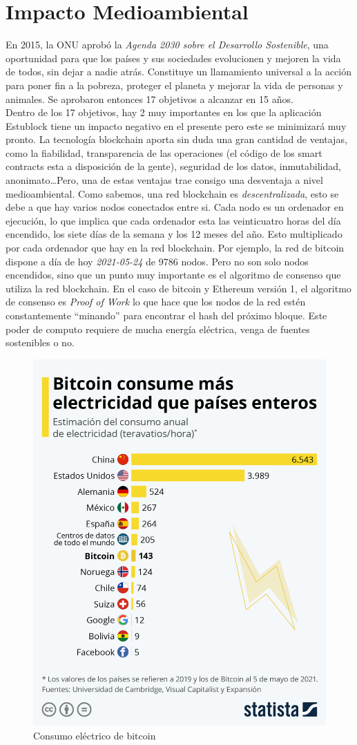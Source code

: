 \chapter{Impacto Medioambiental}
\label{cap:ImpactoMedioAmbiente}

En 2015, la ONU aprobó la \emph{Agenda 2030 sobre el Desarrollo Sostenible}\cite{agenda2030}, una oportunidad para que los países y sus sociedades evolucionen y mejoren la vida de todos, sin dejar a nadie atrás. Constituye un llamamiento universal a la acción para poner fin a la pobreza, proteger el planeta y mejorar la vida de personas y animales. Se aprobaron entonces 17 objetivos\cite{17objetivos} a alcanzar en 15 años. \\

Dentro de los 17 objetivos, hay 2 muy importantes en los que la aplicación Estublock tiene un impacto negativo en el presente pero este se minimizará muy pronto. La tecnología blockchain aporta sin duda una gran cantidad de ventajas, como la fiabilidad, transparencia de las operaciones (el código de los smart contracts esta a disposición de la gente), seguridad de los datos, inmutabilidad, anonimato\dots Pero, una de estas ventajas trae consigo una desventaja a nivel medioambiental. Como sabemos, una red blockchain es \emph{descentralizada}, esto se debe a que hay varios nodos conectados entre si. Cada nodo es un ordenador en ejecución, lo que implica que cada ordenador esta las veinticuatro horas del día encendido, los siete días de la semana y los 12 meses del año. Esto multiplicado por cada ordenador que hay en la red blockchain. Por ejemplo, la red de bitcoin dispone a día de hoy \textit{2021-05-24} de 9786 nodos\cite{bitcoinNodos}. Pero no son solo nodos encendidos, sino que un punto muy importante es el algoritmo de consenso que utiliza la red blockchain. En el caso de bitcoin y Ethereum versión 1, el algoritmo de consenso es \emph{Proof of Work} lo que hace que los nodos de la red estén constantemente ``minando'' para encontrar el hash del próximo bloque. Este poder de computo requiere de mucha energía eléctrica, venga de fuentes sostenibles o no. \\

\begin{figure}[h!]
  \centering
  \includegraphics[width=0.4\linewidth]{figs/ImpactoMedioAmbiente/electricidad_bitcoin}
  \caption[Arquitectura]{Consumo eléctrico de bitcoin}
  \label{fig:electricidad_bitcoin}
\end{figure}

